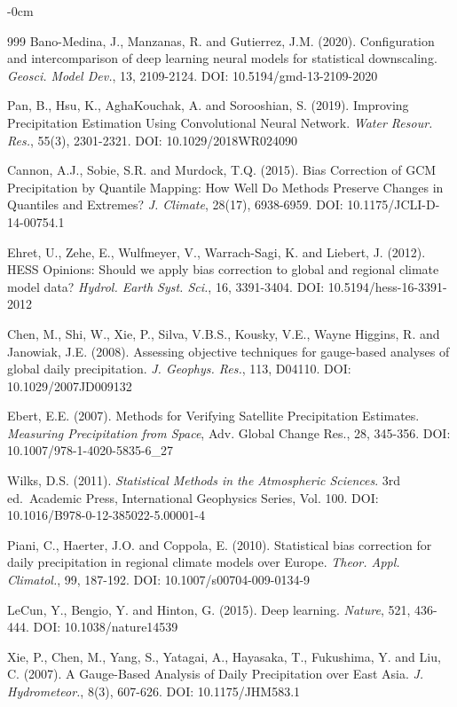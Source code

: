 \documentclass[remotesensing,article,submit,pdftex,moreauthors]{Definitions/mdpi}
\begin{document}
\begin{adjustwidth}{-\extralength}{0cm}
\begin{thebibliography}{999}
 Bano-Medina, J., Manzanas, R. and Gutierrez, J.M. (2020).
Configuration and intercomparison of deep learning neural models for
statistical downscaling. \emph{Geosci. Model Dev.}, 13, 2109-2124. DOI:
10.5194/gmd-13-2109-2020

 Pan, B., Hsu, K., AghaKouchak, A. and Sorooshian, S. (2019).
Improving Precipitation Estimation Using Convolutional Neural Network.
\emph{Water Resour. Res.}, 55(3), 2301-2321. DOI: 10.1029/2018WR024090

 Cannon, A.J., Sobie, S.R. and Murdock, T.Q. (2015). Bias
Correction of GCM Precipitation by Quantile Mapping: How Well Do Methods
Preserve Changes in Quantiles and Extremes? \emph{J. Climate}, 28(17),
6938-6959. DOI: 10.1175/JCLI-D-14-00754.1

 Ehret, U., Zehe, E., Wulfmeyer, V., Warrach-Sagi, K. and
Liebert, J. (2012). HESS Opinions: Should we apply bias correction to
global and regional climate model data? \emph{Hydrol. Earth Syst. Sci.},
16, 3391-3404. DOI: 10.5194/hess-16-3391-2012

 Chen, M., Shi, W., Xie, P., Silva, V.B.S., Kousky, V.E., Wayne
Higgins, R. and Janowiak, J.E. (2008). Assessing objective techniques
for gauge-based analyses of global daily precipitation. \emph{J.
Geophys. Res.}, 113, D04110. DOI: 10.1029/2007JD009132

 Ebert, E.E. (2007). Methods for Verifying Satellite
Precipitation Estimates. \emph{Measuring Precipitation from Space}, Adv.
Global Change Res., 28, 345-356. DOI: 10.1007/978-1-4020-5835-6\_27

 Wilks, D.S. (2011). \emph{Statistical Methods in the
Atmospheric Sciences}. 3rd ed.~Academic Press, International Geophysics
Series, Vol. 100. DOI: 10.1016/B978-0-12-385022-5.00001-4

 Piani, C., Haerter, J.O. and Coppola, E. (2010). Statistical
bias correction for daily precipitation in regional climate models over
Europe. \emph{Theor. Appl. Climatol.}, 99, 187-192. DOI:
10.1007/s00704-009-0134-9

 LeCun, Y., Bengio, Y. and Hinton, G. (2015). Deep learning.
\emph{Nature}, 521, 436-444. DOI: 10.1038/nature14539

 Xie, P., Chen, M., Yang, S., Yatagai, A., Hayasaka, T.,
Fukushima, Y. and Liu, C. (2007). A Gauge-Based Analysis of Daily
Precipitation over East Asia. \emph{J. Hydrometeor.}, 8(3), 607-626.
DOI: 10.1175/JHM583.1


\end{thebibliography}
\end{adjustwidth}
\end{document}
